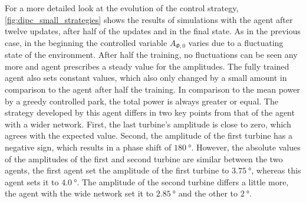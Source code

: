 For a more detailed look at the evolution of the control strategy, \autoref{fig:dipc_small_strategies} shows the results of simulations with the agent after twelve updates, after half of the updates and in the final state. As in the previous case, in the beginning the controlled variable $A_{\Phi,0}$ varies due to a fluctuating state of the environment. After half the training, no fluctuations can be seen any more and agent prescribes a steady value for the amplitudes. The fully trained agent also sets constant values, which also only changed by a small amount in comparison to the agent after half the training. In comparison to the mean power by a greedy controlled park, the total power is always greater or equal. The strategy developed by this agent differs in two key points from that of the agent with a wider network. First, the last turbine's amplitude is close to zero, which agrees with the expected value. Second, the amplitude of the first turbine has a negative sign, which results in a phase shift of $\SI{180}{\degree}$. However, the absolute values of the amplitudes of the first and second turbine are similar between the two agents, the first agent set the amplitude of the first turbine to $\SI{3.75}{\degree}$, whereas this agent sets it to $\SI{4.0}{\degree}$. The amplitude of the second turbine differs a little more, the agent with the wide network set it to $\SI{2.85}{\degree}$ and the other to $\SI{2}{\degree}$. 
